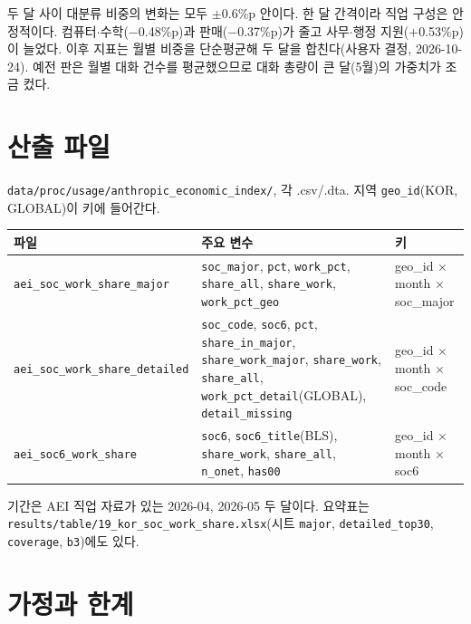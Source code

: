 \documentclass[11pt]{article}
\begin{document}
두 달 사이 대분류 비중의 변화는 모두 $\pm$0.6\%p 안이다. 한 달 간격이라 직업 구성은 안정적이다. 컴퓨터$\cdot$수학($-$0.48\%p)과 판매($-$0.37\%p)가 줄고 사무$\cdot$행정 지원($+$0.53\%p)이 늘었다. 이후 지표는 월별 비중을 단순평균해 두 달을 합친다(사용자 결정, 2026-10-24). 예전 판은 월별 대화 건수를 평균했으므로 대화 총량이 큰 달(5월)의 가중치가 조금 컸다.

\section{산출 파일}

\texttt{data/proc/usage/anthropic\_economic\_index/}, 각 .csv/.dta. 지역 \texttt{geo\_id}(KOR, GLOBAL)이 키에 들어간다.

\begin{longtable}{L{4.6cm}L{7.0cm}L{3.4cm}}
\toprule
파일 & 주요 변수 & 키 \\
\midrule
\texttt{aei\_soc\_work\_share\_major} & \texttt{soc\_major}, \texttt{pct}, \texttt{work\_pct}, \texttt{share\_all}, \texttt{share\_work}, \texttt{work\_pct\_geo} & geo\_id $\times$ month $\times$ soc\_major \\
\texttt{aei\_soc\_work\_share\_detailed} & \texttt{soc\_code}, \texttt{soc6}, \texttt{pct}, \texttt{share\_in\_major}, \texttt{share\_work\_major}, \texttt{share\_work}, \texttt{share\_all}, \texttt{work\_pct\_detail}(GLOBAL), \texttt{detail\_missing} & geo\_id $\times$ month $\times$ soc\_code \\
\texttt{aei\_soc6\_work\_share} & \texttt{soc6}, \texttt{soc6\_title}(BLS), \texttt{share\_work}, \texttt{share\_all}, \texttt{n\_onet}, \texttt{has00} & geo\_id $\times$ month $\times$ soc6 \\
\bottomrule
\end{longtable}

기간은 AEI 직업 자료가 있는 2026-04, 2026-05 두 달이다. 요약표는 \texttt{results/table/19\_kor\_soc\_work\_share.xlsx}(시트 \texttt{major}, \texttt{detailed\_top30}, \texttt{coverage}, \texttt{b3})에도 있다.

\section{가정과 한계}
\end{document}

